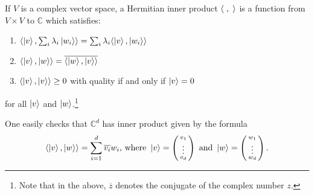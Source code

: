 \begin{definition}
If $V$ is a complex vector space, a Hermitian inner product $\langle\hspace{.1cm},\hspace{.1cm}\rangle$ is a function from $V \times V$ to $\mathbb{C}$ which satisfies: 

\begin{enumerate}
\item $\langle\ket{v}, \sum_i \lambda_i \ket{w_i}\rangle=\sum_i \lambda_i \langle\ket{v}, \ket{w_i}\rangle$
\item $\langle\ket{v}, \ket{w}\rangle=\overline{\langle\ket{w}, \ket{v}\rangle}$
\item $\langle\ket{v}, \ket{v}\rangle \ge 0$ \textrm{ with quality if and only if }$\ket{v}=0$
\end{enumerate}
for all $\ket{v}$ and $\ket{w}$.\footnote{Note that in the above, $\overline{z}$ denotes the conjugate of the complex number $z$.} 
\end{definition}

One easily checks that $\mathbb{C}^d$ has inner product given by the formula
\begin{equation} \label{inner product defn}
  \langle \ket{v},\ket{w}\rangle=\sum\limits_{i=1}^d \overline{v_i} w_i \textrm{, where }
  \ket{v}=\left(\begin{smallmatrix}v_1\\ \vdots\\v_d\end{smallmatrix}\right) \textrm{ and }\ket{w}=\left(\begin{smallmatrix}w_1\\ \vdots\\w_d\end{smallmatrix}\right).
\end{equation}


